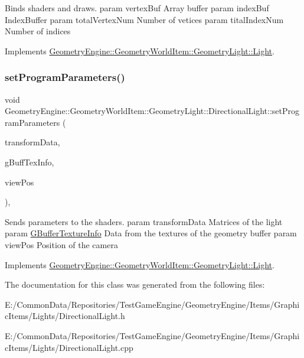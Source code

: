 Binds shaders and draws. param vertex\+Buf Array buffer param index\+Buf Index\+Buffer param total\+Vertex\+Num Number of vetices param tital\+Index\+Num Number of indices 

Implements \mbox{\hyperlink{class_geometry_engine_1_1_geometry_world_item_1_1_geometry_light_1_1_light_a58aa2a3520f7aa2b03afcb4123e7530a}{Geometry\+Engine\+::\+Geometry\+World\+Item\+::\+Geometry\+Light\+::\+Light}}.

\mbox{\label{class_geometry_engine_1_1_geometry_world_item_1_1_geometry_light_1_1_directional_light_ae395d609ee47dd5d399514bb2c76d2db}} 
\subsubsection{\texorpdfstring{setProgramParameters()}{setProgramParameters()}}
{\footnotesize\ttfamily void Geometry\+Engine\+::\+Geometry\+World\+Item\+::\+Geometry\+Light\+::\+Directional\+Light\+::set\+Program\+Parameters (\begin{DoxyParamCaption}\item[{const \mbox{\hyperlink{struct_geometry_engine_1_1_lighting_transformation_data}{Lighting\+Transformation\+Data}} \&}]{transform\+Data,  }\item[{const \mbox{\hyperlink{struct_geometry_engine_1_1_g_buffer_texture_info}{G\+Buffer\+Texture\+Info}} \&}]{g\+Buff\+Tex\+Info,  }\item[{const Q\+Vector3D \&}]{view\+Pos }\end{DoxyParamCaption})\hspace{0.3cm}{\ttfamily [protected]}, {\ttfamily [virtual]}}

Sends parameters to the shaders. param transform\+Data Matrices of the light param \mbox{\hyperlink{struct_geometry_engine_1_1_g_buffer_texture_info}{G\+Buffer\+Texture\+Info}} Data from the textures of the geometry buffer param view\+Pos Position of the camera 

Implements \mbox{\hyperlink{class_geometry_engine_1_1_geometry_world_item_1_1_geometry_light_1_1_light_a366be5945389fe58df4bf5aa8c43138f}{Geometry\+Engine\+::\+Geometry\+World\+Item\+::\+Geometry\+Light\+::\+Light}}.



The documentation for this class was generated from the following files\+:\begin{DoxyCompactItemize}
\item 
E\+:/\+Common\+Data/\+Repositories/\+Test\+Game\+Engine/\+Geometry\+Engine/\+Items/\+Graphic\+Items/\+Lights/Directional\+Light.\+h\item 
E\+:/\+Common\+Data/\+Repositories/\+Test\+Game\+Engine/\+Geometry\+Engine/\+Items/\+Graphic\+Items/\+Lights/Directional\+Light.\+cpp\end{DoxyCompactItemize}
